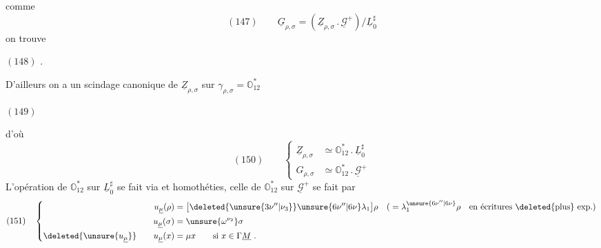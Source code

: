
comme
\[
(147)\qquad\underline G_{\rho,\sigma}
=(\underline Z_{\rho,\sigma}\mathbin{.}\underline{\mathcal G}^{+})/\underline L_0^{\sharp}
\]
on trouve

\((148)\)
.

D'ailleurs on a un scindage canonique
de \(\underline Z_{\rho,\sigma}\) sur \(\gamma_{\rho,\sigma}=\mathbb O_{12}^{*}\)

\((149)\)


d'où
\[
(150)\qquad
\left\{\begin{aligned}
\underline Z_{\rho,\sigma}&\simeq\mathbb O_{12}^{*}\mathbin{.}\underline L_0^{\sharp}\\
G_{\rho,\sigma}&\simeq\mathbb O_{12}^{*}\mathbin{.}\underline{\mathcal G}^{+}
\end{aligned}\right.
\]
L'opération de \(\mathbb O_{12}^{*}\) sur \(\underline L_0^{\sharp}\) se fait
via
et homothéties, celle
de \(\mathbb O_{12}^{*}\) sur \(\underline{\mathcal G}^{+}\) se fait par
\[
(151)\quad
\left\{\begin{aligned}
u_{\underline\mu}(\rho)&=\bigl[\deleted{\unsure{3\nu''|\nu_3}}\unsure{6\nu''|6\nu}\lambda_1\bigr]\rho
\quad\text{(}=\lambda_1^{\unsure{6\nu''|6\nu}}\rho\quad\text{en écritures \deleted{plus} exp.}\text{)}\\
u_{\underline\mu}(\sigma)&=\unsure{\omega^{\nu_2}}\sigma\\
\deleted{\unsure{u_{\underline\mu}}}\qquad u_{\underline\mu}(x)&=\mu x\qquad\text{si }x\in\Gamma\underline M\ .
\end{aligned}\right.
\]

